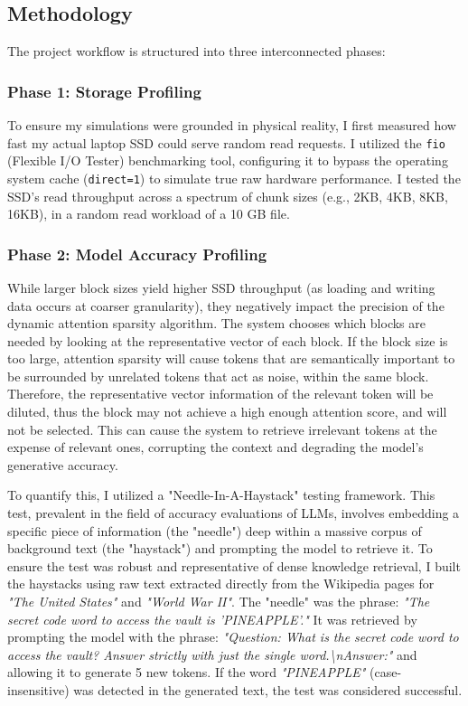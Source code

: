 \documentclass[conference]{IEEEtran}
\begin{document}
        \subsection{Methodology}
            The project workflow is structured into three interconnected phases:

        \subsubsection*{\textbf{Phase 1: Storage Profiling}}
            To ensure my simulations were grounded in physical reality, I first measured how fast my actual laptop SSD could serve random read requests. I utilized the \texttt{fio} (Flexible I/O Tester) benchmarking tool, configuring it to bypass the operating system cache (\texttt{direct=1}) to simulate true raw hardware performance. I tested the SSD's read throughput across a spectrum of chunk sizes (e.g., 2KB, 4KB, 8KB, 16KB), in a random read workload of a 10 GB file.

        \subsubsection*{\textbf{Phase 2: Model Accuracy Profiling}}
            While larger block sizes yield higher SSD throughput (as loading and writing data occurs at coarser granularity), they negatively impact the precision of the dynamic attention sparsity algorithm. The system chooses which blocks are needed by looking at the representative vector of each block. If the block size is too large, attention sparsity will cause tokens that are semantically important to be surrounded by unrelated tokens that act as noise, within the same block. Therefore, the representative vector information of the relevant token will be diluted, thus the block may not achieve a high enough attention score, and will not be selected. This can cause the system to retrieve irrelevant tokens at the expense of relevant ones, corrupting the context and degrading the model's generative accuracy.

            To quantify this, I utilized a "Needle-In-A-Haystack" testing framework. This test, prevalent in the field of accuracy evaluations of LLMs, involves embedding a specific piece of information (the "needle") deep within a massive corpus of background text (the "haystack") and prompting the model to retrieve it. To ensure the test was robust and representative of dense knowledge retrieval, I built the haystacks using raw text extracted directly from the Wikipedia pages for \textit{"The United States"} and \textit{"World War II"}. The "needle" was the phrase: \textit{"The secret code word to access the vault is 'PINEAPPLE'."} It was retrieved by prompting the model with the phrase: \textit{"Question: What is the secret code word to access the vault? Answer strictly with just the single word.\textbackslash{}nAnswer:"} and allowing it to generate 5 new tokens. If the word \textit{"PINEAPPLE"} (case-insensitive) was detected in the generated text, the test was considered successful.
\end{document}
